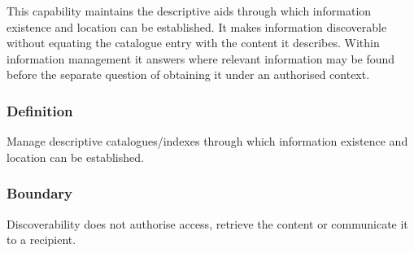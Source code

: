 This capability maintains the descriptive aids through which information existence and location can be established. It makes information discoverable without equating the catalogue entry with the content it describes. Within information management it answers where relevant information may be found before the separate question of obtaining it under an authorised context.

\subsubsection*{Definition}

Manage descriptive catalogues/\allowbreak{}indexes through which information existence and location can be established.

\subsubsection*{Boundary}

Discoverability does not authorise access, retrieve the content or communicate it to a recipient.

